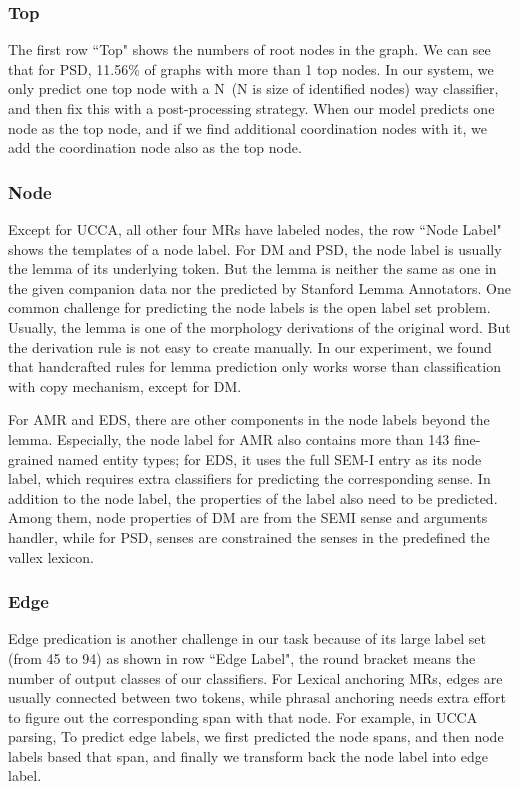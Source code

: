 \subsubsection{Top}
\label{sssec:lex:top}

The first row ``Top" shows the numbers of root nodes in
the graph.  We can see that for PSD, 11.56\% of graphs with more than
1 top nodes. In our system, we only predict one top node with a N~(N is size of identified nodes) way
classifier, and then fix this with a post-processing strategy. When
our model predicts one node as the top node, and if we find additional
coordination nodes with it, we add the coordination node also as the
top node.

\subsubsection{Node}
\label{sssec:lex:node}

Except for UCCA, all other four MRs have labeled
nodes, the row ``Node Label" shows the templates of a node label. For
DM and PSD, the node label is usually the lemma of its underlying
token. But the lemma is neither the same as one in the given companion
data nor the predicted by Stanford Lemma Annotators. One common
challenge for predicting the node labels is the open label set
problem. Usually, the lemma is one of the morphology derivations of
the original word. But the derivation rule is not easy to create
manually. In our experiment, we found that handcrafted rules for lemma
prediction only works worse than classification with copy mechanism,
except for DM.

For AMR and EDS, there are other components in the node
labels beyond the lemma. Especially, the node label for AMR also
contains more than 143 fine-grained named entity types; for EDS, it
uses the full SEM-I entry as its node label, which requires extra
classifiers for predicting the corresponding sense. In addition to the
node label, the properties of the label also need to be
predicted. Among them, node properties of DM are from the SEMI sense
and arguments handler, while for PSD, senses are constrained the
senses in the predefined the vallex lexicon.

\subsubsection{Edge}
\label{sssec:lex:edge}

Edge predication is another challenge in our task
because of its large label set (from 45 to 94) as shown in row ``Edge
Label", the round bracket means the number of output classes of our
classifiers. For Lexical anchoring MRs, edges are usually connected
between two tokens, while phrasal anchoring needs extra effort to
figure out the corresponding span with that node. For example, in UCCA
parsing, To predict edge labels, we first predicted the node spans,
and then node labels based that span, and finally we transform back
the node label into edge label.

